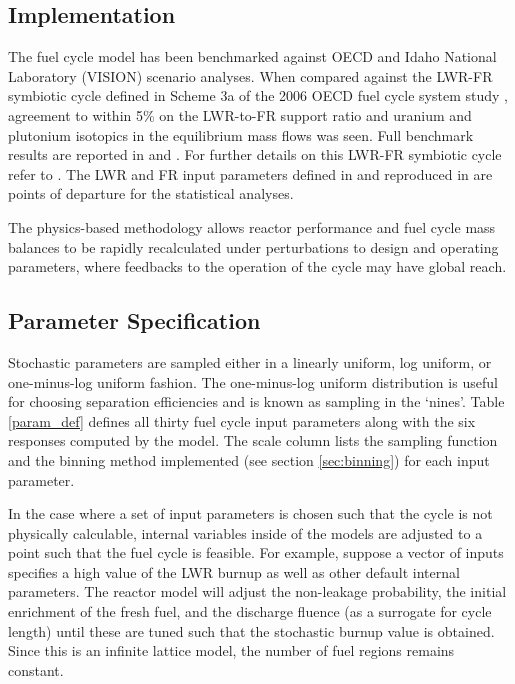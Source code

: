 \documentclass[preprint,12pt]{elsarticle}
\begin{document}
\subsection{Implementation}
\label{sec:implementation}

The fuel cycle model has been benchmarked against OECD and Idaho National Laboratory
(VISION) scenario analyses. When compared against the LWR-FR symbiotic cycle defined in Scheme
3a of the 2006 OECD fuel cycle system study \cite{NEA-5990}, agreement to within 5\% on the LWR-to-FR support
ratio and uranium and plutonium isotopics in the equilibrium mass flows was seen. Full benchmark
results are reported in \cite{Scopatz2009} and \cite{Li2009}.  For further details on this LWR-FR
symbiotic cycle refer to \cite{Shropshire2009}. The LWR and FR input parameters defined in
\cite{Shropshire2009} and reproduced in \cite{Scopatz2009} are points of departure for the
statistical analyses.

The physics-based methodology allows reactor performance and fuel cycle mass
balances to be rapidly recalculated under perturbations to design and operating parameters, where feedbacks to the operation of the cycle may have global reach.

\subsection{Parameter Specification}
\label{sec:paramspec}

Stochastic parameters are sampled either in a linearly uniform, log uniform, or one-minus-log uniform fashion.
The one-minus-log uniform distribution is useful for choosing separation efficiencies and is known as sampling
in the `nines'.  Table \ref{param_def} defines all thirty fuel cycle input parameters along with the six
responses computed by the model.  The scale column lists the sampling function
and the binning method implemented (see section \ref{sec:binning}) for each input parameter.

In the case where a set of input parameters is chosen such that the cycle is not physically calculable,
internal variables inside of the models are adjusted to a point such that the fuel cycle is feasible.
For example, suppose a vector of inputs specifies a high value of the LWR burnup as well as other default
internal parameters.  The reactor model will adjust the non-leakage probability, the initial enrichment
of the fresh fuel, and the discharge fluence (as a surrogate for cycle length) until 
these are tuned such that the stochastic burnup value is obtained.  Since this 
is an infinite lattice model, the number of fuel regions remains constant.
\end{document}
